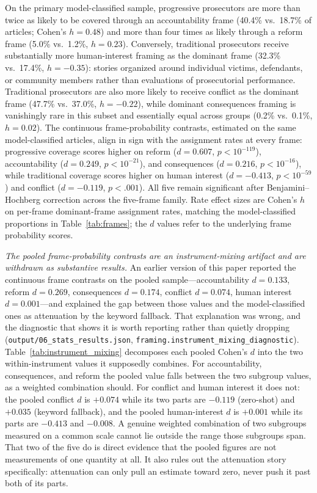 \documentclass[12pt, letterpaper]{article}
\begin{document}
On the primary model-classified sample, progressive prosecutors are more than twice as likely to be covered through an accountability frame (40.4\% vs.\ 18.7\% of articles; Cohen's $h = 0.48$) and more than four times as likely through a reform frame (5.0\% vs.\ 1.2\%, $h = 0.23$). Conversely, traditional prosecutors receive substantially more human-interest framing as the dominant frame (32.3\% vs.\ 17.4\%, $h = -0.35$): stories organized around individual victims, defendants, or community members rather than evaluations of prosecutorial performance. Traditional prosecutors are also more likely to receive conflict as the dominant frame (47.7\% vs.\ 37.0\%, $h = -0.22$), while dominant consequences framing is vanishingly rare in this subset and essentially equal across groups (0.2\% vs.\ 0.1\%, $h = 0.02$). The continuous frame-probability contrasts, estimated on the same model-classified articles, align in sign with the assignment rates at every frame: progressive coverage scores higher on reform ($d = 0.607$, $p < 10^{-119}$), accountability ($d = 0.249$, $p < 10^{-21}$), and consequences ($d = 0.216$, $p < 10^{-16}$), while traditional coverage scores higher on human interest ($d = -0.413$, $p < 10^{-59}$) and conflict ($d = -0.119$, $p < .001$). All five remain significant after Benjamini--Hochberg correction across the five-frame family. Rate effect sizes are Cohen's $h$ on per-frame dominant-frame assignment rates, matching the model-classified proportions in Table~\ref{tab:frames}; the $d$ values refer to the underlying frame probability scores.

\emph{The pooled frame-probability contrasts are an instrument-mixing artifact and are withdrawn as substantive results.} An earlier version of this paper reported the continuous frame contrasts on the pooled sample---accountability $d = 0.133$, reform $d = 0.269$, consequences $d = 0.174$, conflict $d = 0.074$, human interest $d = 0.001$---and explained the gap between those values and the model-classified ones as attenuation by the keyword fallback. That explanation was wrong, and the diagnostic that shows it is worth reporting rather than quietly dropping (\texttt{output/06\_stats\_results.json}, \texttt{framing.instrument\_mixing\_diagnostic}). Table~\ref{tab:instrument_mixing} decomposes each pooled Cohen's $d$ into the two within-instrument values it supposedly combines. For accountability, consequences, and reform the pooled value falls between the two subgroup values, as a weighted combination should. For conflict and human interest it does not: the pooled conflict $d$ is $+0.074$ while its two parts are $-0.119$ (zero-shot) and $+0.035$ (keyword fallback), and the pooled human-interest $d$ is $+0.001$ while its parts are $-0.413$ and $-0.008$. A genuine weighted combination of two subgroups measured on a common scale cannot lie outside the range those subgroups span. That two of the five do is direct evidence that the pooled figures are not measurements of one quantity at all. It also rules out the attenuation story specifically: attenuation can only pull an estimate toward zero, never push it past both of its parts.
\end{document}
